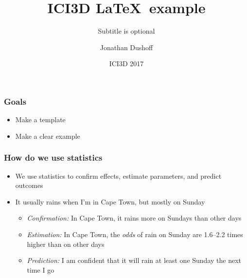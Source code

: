\documentclass{beamer}
\begin{document}
\title{ICI3D \LaTeX\ example}
\subtitle{Subtitle is optional} %
\author{Jonathan Dushoff}
\date{ICI3D 2017} %
\newcommand{\years}{2017} %
\newcommand{\figshare}{https://figshare.com/articles/NAME/NUMBER}



\begin{frame}

\frametitle{Goals}

\begin{itemize}

\item Make a template

\item Make a clear example

\end{itemize}

\end{frame}
\begin{frame}

\frametitle{How do we use statistics}

\begin{itemize}

	\item We use statistics to confirm effects, estimate parameters, and
		predict outcomes

	\item It usually rains when I'm in Cape Town, but mostly on Sunday

	\begin{itemize}

		\item \emph{Confirmation:} In Cape Town, it rains more on Sundays than
				other days

		\item \emph{Estimation:} In Cape Town, the \emph{odds} of rain on
				Sunday are 1.6--2.2 times higher than on other days

		\item \emph{Prediction:} I am confident that it will rain at least one
				Sunday the next time I go

	\end{itemize}

\end{itemize}

\end{frame}
\end{document}
